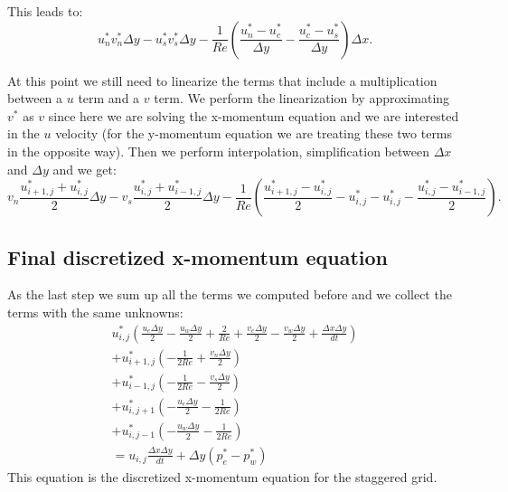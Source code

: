 \documentclass{article}
\begin{document}
This leads to:
\begin{equation*}
  u_n^* v_n^* \Delta y - u_s^* v_s^* \Delta y - \frac{1}{Re} \left( \frac{u_n^* - u_c^*}{\Delta y} - \frac{u_c^* - u_s^*}{\Delta y}\right) \Delta x.
\end{equation*}

At this point we still need to linearize the terms that include a multiplication between a $u$ term and a $v$ term. We perform the linearization by approximating $v^*$ as $v$ since here we are solving the x-momentum equation and we are interested in the $u$ velocity (for the y-momentum equation we are treating these two terms in the opposite way).
Then we perform interpolation, simplification between $\Delta x$ and $\Delta y$ and we get:
\begin{equation}
  v_n \frac{u_{i+1,j}^* + u_{i,j}^*}{2} \Delta y - v_s \frac{u_{i,j}^* + u_{i-1,j}^*}{2} \Delta y - \frac{1}{Re} \left( \frac{u_{i+1,j}^* - u_{i,j}^*}{2} - u_{i,j}^* - u_{i,j}^* - \frac{u_{i,j}^* - u_{i-1,j}^*}{2}\right).
\end{equation}

\subsection*{Final discretized x-momentum equation}
As the last step we sum up all the terms we computed before and we collect the terms with the same unknowns:
\begin{gather*}
    u_{i,j}^* \left(\frac{u_e \Delta y}{2} - \frac{u_w \Delta y}{2} + \frac{2}{Re} + \frac{v_e \Delta y}{2} - \frac{v_w \Delta y}{2} + \frac{\Delta x \Delta y}{dt} \right) \\
    + u_{i+1,j}^* \left(- \frac{1}{2 Re} + \frac{v_n \Delta y}{2} \right) \\
    + u_{i-1,j}^* \left(- \frac{1}{2 Re} - \frac{v_s \Delta y}{2} \right) \\
    + u_{i,j+1}^* \left(- \frac{u_e \Delta y}{2} - \frac{1}{2 Re} \right) \\
    + u_{i,j-1}^* \left(- \frac{u_w \Delta y}{2} - \frac{1}{2 Re} \right) \\
    = u_{i,j} \frac{ \Delta x \Delta y}{dt} + \Delta y (p_{e}^* - p_{w}^*)
\end{gather*}
This equation is the discretized x-momentum equation for the staggered grid.
\end{document}
